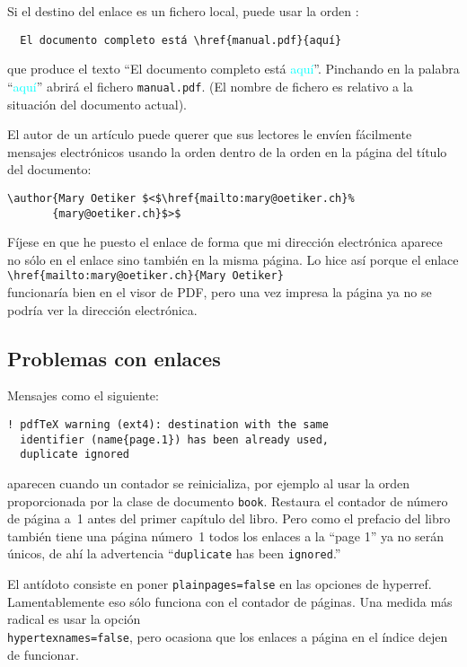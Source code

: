 Si el destino del enlace es un fichero local, puede usar la orden
: 
\begin{verbatim}
  El documento completo está \href{manual.pdf}{aquí}
\end{verbatim}
que produce el texto ``El documento completo está
\textcolor{cyan}{aquí}''.
Pinchando en la palabra
``\textcolor{cyan}{aquí}''
abrirá el fichero \texttt{manual.pdf}. (El nombre de fichero es
relativo a la situación del documento actual).

El autor de un artículo puede querer que sus lectores le envíen
fácilmente mensajes electrónicos usando la orden  dentro de
la orden  en la página del título del documento:
\begin{code}
\begin{verbatim}
\author{Mary Oetiker $<$\href{mailto:mary@oetiker.ch}%
       {mary@oetiker.ch}$>$
\end{verbatim}
\end{code}
Fíjese en que he puesto el enlace de forma que mi dirección
electrónica aparece no sólo en el enlace sino también en la misma
página.  Lo hice así porque el enlace\\
\verb+\href{mailto:mary@oetiker.ch}{Mary Oetiker}+\\
funcionaría bien en el visor de PDF, pero una vez impresa la página ya
no se podría ver la dirección electrónica.


\subsection{Problemas con enlaces}

Mensajes como el siguiente:
\begin{verbatim}
! pdfTeX warning (ext4): destination with the same
  identifier (name{page.1}) has been already used,
  duplicate ignored
\end{verbatim}
aparecen cuando un contador se reinicializa, por ejemplo al usar la
orden  proporcionada por la clase de documento
\texttt{book}.  Restaura el contador de número de página a~1 antes del
primer capítulo del libro.  Pero como el prefacio del libro también
tiene una página número~1 todos los enlaces a la ``page 1'' ya no
serán únicos, de ahí la advertencia ``\verb+duplicate+ has been
\verb+ignored+.''

El antídoto consiste en poner \texttt{plainpages=false} en las
opciones de hyperref.  Lamentablemente eso sólo funciona con el
contador de páginas.  Una medida más radical es usar la opción\\
\texttt{hypertexnames=false}, pero ocasiona que los enlaces a página
en el índice dejen de funcionar.

